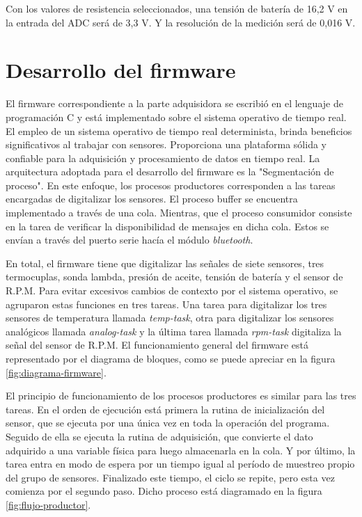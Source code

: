Con los valores de resistencia seleccionados, una tensión de batería de 16,2 V en la entrada del ADC será de 3,3 V. Y la resolución de la medición será de 0,016 V.

\break

\section{Desarrollo del firmware}

El firmware correspondiente a la parte adquisidora se escribió en el lenguaje de programación C y está implementado sobre el sistema operativo de tiempo real. El empleo de un sistema operativo de tiempo real determinista, brinda beneficios significativos al trabajar con sensores. Proporciona una plataforma sólida y confiable para la adquisición y procesamiento de datos en tiempo real. La arquitectura adoptada para el desarrollo del firmware es la "Segmentación de proceso". En este enfoque, los procesos productores corresponden a las tareas encargadas de digitalizar los sensores. El proceso buffer se encuentra implementado a través de una cola. Mientras, que el proceso consumidor consiste en la tarea de verificar la disponibilidad de mensajes en dicha cola. Estos se envían a través del puerto serie hacía el módulo \textit{bluetooth}.

En total, el firmware tiene que digitalizar las señales de siete sensores, tres termocuplas, sonda lambda, presión de aceite, tensión de batería y el sensor de R.P.M. Para evitar excesivos cambios de contexto por el sistema operativo, se agruparon estas funciones en tres tareas. Una tarea para digitalizar los tres sensores de temperatura llamada \textit{temp-task}, otra para digitalizar los sensores analógicos llamada \textit{analog-task} y la última tarea llamada \textit{rpm-task} digitaliza la señal del sensor de R.P.M. El funcionamiento general del firmware está representado por el diagrama de bloques, como se puede apreciar en la figura \ref{fig:diagrama-firmware}.

El principio de funcionamiento de los procesos productores es similar para las tres tareas. En el orden de ejecución está primera la rutina de inicialización del sensor, que se ejecuta por una única vez en toda la operación del programa. Seguido de ella se ejecuta la rutina de adquisición, que convierte el dato adquirido a una variable física para luego almacenarla en la cola. Y por último, la tarea entra en modo de espera por un tiempo igual al período de muestreo propio del grupo de sensores. Finalizado este tiempo, el ciclo se repite, pero esta vez comienza por el segundo paso. Dicho proceso está diagramado en la figura \ref{fig:flujo-productor}.

